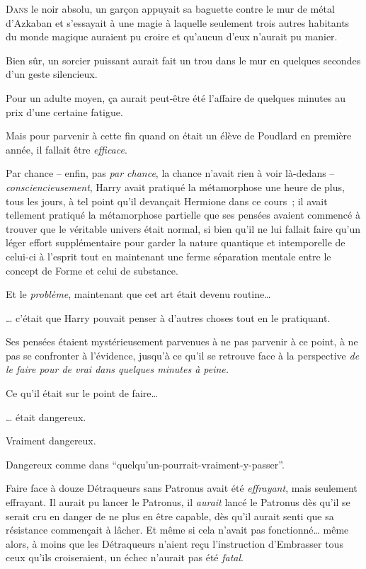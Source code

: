 

\lettrine{D}{ans}  le noir absolu, un garçon appuyait sa baguette contre le mur de métal d'Azkaban et s'essayait à une magie à laquelle seulement trois autres habitants du monde magique auraient pu croire et qu'aucun d'eux n'aurait pu manier.

Bien sûr, un sorcier puissant aurait fait un trou dans le mur en quelques secondes d'un geste silencieux.

Pour un adulte moyen, ça aurait peut-être été l'affaire de quelques minutes au prix d'une certaine fatigue.

Mais pour parvenir à cette fin quand on était un élève de Poudlard en première année, il fallait être \emph{efficace}.

Par chance -- enfin, pas \emph{par chance}, la chance n'avait rien à voir là-dedans -- \emdashhyp\emph{consciencieusement}, Harry avait pratiqué la métamorphose une heure de plus, tous les jours, à tel point qu'il devançait Hermione dans ce cours~; il avait tellement pratiqué la métamorphose partielle que ses pensées avaient commencé à trouver que le véritable univers était normal, si bien qu'il ne lui fallait faire qu'un léger effort supplémentaire pour garder la nature quantique et intemporelle de celui-ci à l'esprit tout en maintenant une ferme séparation mentale entre le concept de Forme et celui de substance.

Et le \emph{problème}, maintenant que cet art était devenu routine…

… c'était que Harry pouvait penser à d'autres choses tout en le pratiquant.

Ses pensées étaient mystérieusement parvenues à ne pas parvenir à ce point, à ne pas se confronter à l'évidence, jusqu'à ce qu'il se retrouve face à la perspective \emph{de le faire pour de vrai dans quelques minutes à peine.}

Ce qu'il était sur le point de faire…

… était dangereux.

Vraiment dangereux.

Dangereux comme dans “quelqu'un-pourrait-vraiment-y-passer”.

Faire face à douze Détraqueurs sans Patronus avait été \emph{effrayant}, mais seulement effrayant. Il aurait pu lancer le Patronus, il \emph{aurait} lancé le Patronus dès qu'il se serait cru en danger de ne plus en être capable, dès qu'il aurait senti que sa résistance commençait à lâcher. Et même si cela n'avait pas fonctionné… même alors, à moins que les Détraqueurs n'aient reçu l'instruction d'Embrasser tous ceux qu'ils croiseraient, un échec n'aurait pas été \emph{fatal}.

